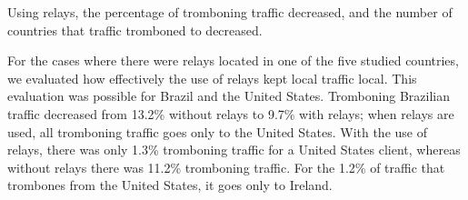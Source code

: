 \begin{finding}
Using relays, the percentage of tromboning traffic decreased, and the number of countries that traffic tromboned to decreased.
\end{finding}
For the cases where there were relays located in one of the five studied countries, we evaluated how effectively the use of relays kept local traffic local.  This evaluation was possible for Brazil and the United States.  Tromboning Brazilian traffic decreased from 13.2\% without relays to 9.7\% with relays; when relays are used, all tromboning traffic goes only to the United States.  With the use of relays, there was only 1.3\% tromboning traffic for a United States client, whereas without relays there was 11.2\% tromboning traffic.  For the 1.2\% of traffic that trombones from the United States, it goes only to Ireland.
